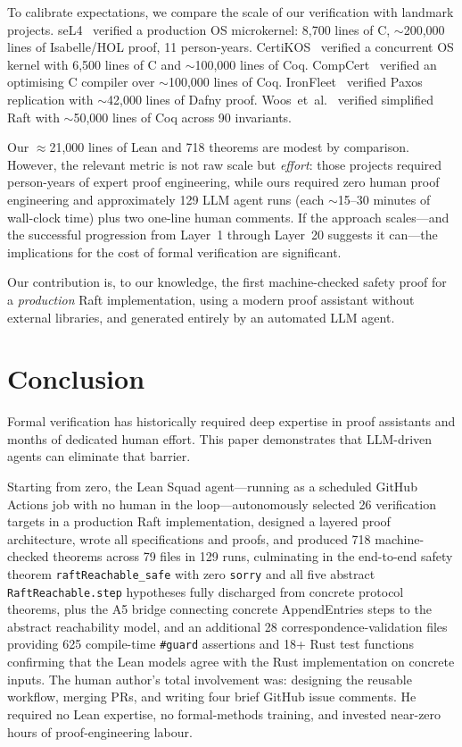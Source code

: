\documentclass[sigconf,10pt]{acmart}
\begin{document}
To calibrate expectations, we compare the scale of our verification
with landmark projects.
seL4~\cite{klein2009sel4} verified a production OS microkernel: 8,700
lines of C, $\sim$200,000 lines of Isabelle/HOL proof, 11 person-years.
CertiKOS~\cite{gu2016certikos} verified a concurrent OS kernel with
6,500 lines of C and $\sim$100,000 lines of Coq.
CompCert~\cite{compcert} verified an optimising C compiler over
$\sim$100,000 lines of Coq.
IronFleet~\cite{ironfleet} verified Paxos replication with
$\sim$42,000 lines of Dafny proof.
Woos~et~al.~\cite{vard} verified simplified Raft with $\sim$50,000
lines of Coq across 90 invariants.

Our $\approx$21{,}000 lines of Lean and 718 theorems are modest by comparison.
However, the relevant metric is not raw scale but \emph{effort}:
those projects required person-years of expert proof engineering,
while ours required zero human proof engineering and approximately
129 LLM agent runs (each $\sim$15--30 minutes of wall-clock time)
plus two one-line human comments.  If the approach scales---and the
successful progression from Layer~1 through Layer~20 suggests it
can---the implications for the cost of formal verification are
significant.

\medskip\noindent
Our contribution is, to our knowledge, the first machine-checked
safety proof for a \emph{production} Raft implementation, using a
modern proof assistant without external libraries, and generated
entirely by an automated LLM agent.

\section{Conclusion}

Formal verification has historically required deep expertise in proof
assistants and months of dedicated human effort.  This paper demonstrates
that LLM-driven agents can eliminate that barrier.

Starting from zero, the Lean Squad agent---running as a scheduled
GitHub Actions job with no human in the loop---autonomously selected
26 verification targets in a production Raft implementation, designed
a layered proof architecture, wrote all specifications and proofs,
and produced 718 machine-checked theorems across 79 files in 129 runs,
culminating in the end-to-end safety theorem
\texttt{raftReachable\_safe} with zero \texttt{sorry} and all five
abstract \texttt{RaftReachable.step} hypotheses fully discharged from
concrete protocol theorems, plus the A5
bridge connecting concrete AppendEntries steps to the abstract
reachability model, and an additional 28 correspondence-validation
files providing 625 compile-time \texttt{\#guard} assertions and 18+
Rust test functions confirming that the Lean models agree with the
Rust implementation on concrete inputs.
The human author's total involvement was: designing the reusable
workflow, merging PRs, and writing four brief GitHub issue comments.
He required no Lean expertise, no formal-methods training, and
invested near-zero hours of proof-engineering labour.
\end{document}
